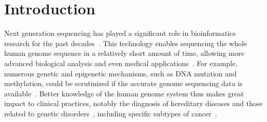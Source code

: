 \documentclass{PHlab-thesis}
\begin{document}

\printnomenclature[5cm]

\newpage
\setcounter{page}{1}


\chapter{Introduction}
Next generation sequencing has played a significant role in bioinformatics research for the past decades~\cite{behjati2013next,schuster2008next}. This technology enables sequencing the whole human genome sequence in a relatively short amount of time, allowing more advanced biological analysis and even medical applications~\cite{roukos2010next}. For example, numerous genetic and epigenetic mechanisms, such as DNA mutation and methylation, could be scrutinized if the accurate genome sequencing data is available~\cite{moore2013dna}. Better knowledge of the human genome system thus makes great impact to clinical practices, notably the diagnosis of hereditary diseases and those related to genetic disorders~\cite{shashi2014utility,stenson2017human}, including specific subtypes of cancer~\cite{serrati2016next}.
\end{document}
